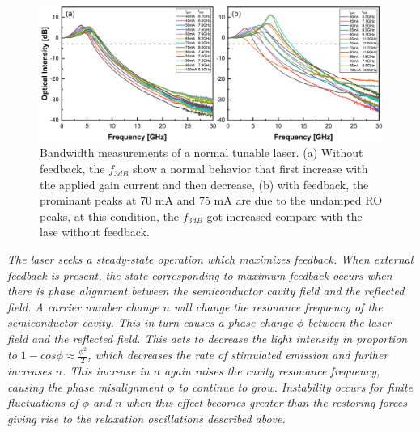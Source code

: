 \begin{figure}[ht]
    \centering
    \includegraphics[width=\linewidth]{figures/bandwidth_gain_scan_cleaved_and_lensed_grating_4679.png}
    \caption{Bandwidth measurements of a normal tunable laser. (a) Without feedback, the $f_{3dB}$ show a normal behavior that first increase with the applied gain current and then decrease, (b) with feedback, the prominant peaks at 70 mA and 75 mA are due to the undamped RO peaks, at this condition, the $f_{3dB}$ got increased compare with the lase without feedback.}
    \label{fig:bandwidth_gain_scan_cleaved_and_lensed}
\end{figure}



\textit{The laser seeks a steady-state operation which maximizes feedback. When external feedback is present, the state corresponding to maximum feedback occurs when there is phase alignment  between the semiconductor cavity field and the reflected field. A carrier number change $n$ will change the resonance frequency of the semiconductor cavity. This in turn causes a phase change $\phi$ between the laser field and the reflected field. This acts to decrease the light intensity in proportion to $1-cos{\phi}\approx\frac{\phi^2}{2}$, which decreases the rate of stimulated emission and further increases $n$. This increase in $n$ again raises the cavity resonance frequency, causing the phase misalignment $\phi$ to continue to grow. Instability occurs for finite fluctuations of $\phi$ and $n$ when this effect becomes greater than the restoring forces giving rise to the relaxation oscillations described above.}

